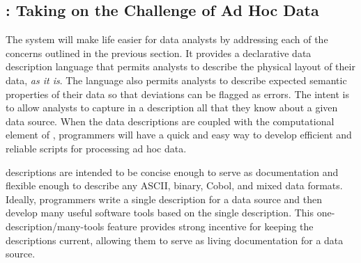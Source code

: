 \documentclass[11pt]{article}
\begin{document}
\subsection{\datatype{}:  Taking on the Challenge of Ad Hoc Data}
\label{sec:datatype-overview}

The \datatype{} system will make life easier for data analysts by addressing
each of the concerns outlined in the previous section.
It provides a declarative data description
language that permits analysts to describe the physical layout of
their data, \textit{as it is}.  The language also permits analysts to
describe expected semantic properties of their data so that deviations can
be flagged as errors. The intent is to allow analysts to capture in a
\datatype{} description all that they know about a given data source.
When the data descriptions are coupled with the computational element
of \datatype{}, programmers will have a quick and easy way to
develop efficient and reliable scripts for processing ad hoc data.



\datatype{} descriptions are intended to be concise enough to serve as
documentation and flexible enough to describe any ASCII, binary,
Cobol, and mixed data formats.  Ideally, programmers write
a single description for a data source and then develop
many useful software tools based on
the single description.  This one-description/many-tools feature provides
strong incentive for keeping the descriptions current, allowing them
to serve as living documentation for a data source.
  
\end{document}

